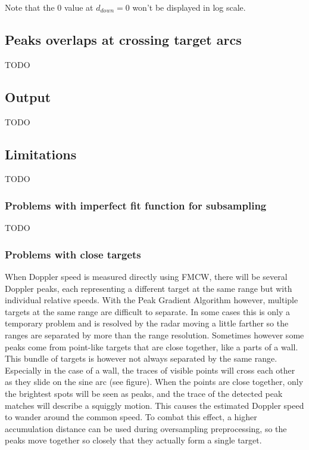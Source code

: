 Note that the \(0\) value at \(d_{down}=0\) won't be displayed in log
scale.

\subsection{Peaks overlaps at crossing target arcs}\label{peaks-overlaps-at-crossing-target-arcs}

TODO

\subsection{Output}\label{output}

TODO

\subsection{Limitations}\label{limitations-1}

TODO

\subsubsection{Problems with imperfect fit function for subsampling}\label{problems-with-imperfect-fit-function-for-subsampling}

TODO

\subsubsection{Problems with close targets}\label{problems-with-close-targets}

When Doppler speed is measured directly using FMCW, there will be
several Doppler peaks, each representing a different target at the same
range but with individual relative speeds. With the Peak Gradient
Algorithm however, multiple targets at the same range are difficult to
separate. In some cases this is only a temporary problem and is resolved
by the radar moving a little farther so the ranges are separated by more
than the range resolution. Sometimes however some peaks come from
point-like targets that are close together, like a parts of a wall. This
bundle of targets is however not always separated by the same range.
Especially in the case of a wall, the traces of visible points will
cross each other as they slide on the sine arc (see figure). When the
points are close together, only the brightest spots will be seen as
peaks, and the trace of the detected peak matches will describe a
squiggly motion. This causes the estimated Doppler speed to wander
around the common speed. To combat this effect, a higher accumulation
distance can be used during oversampling preprocessing, so the peaks
move together so closely that they actually form a single target.

